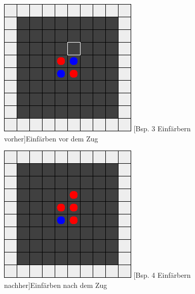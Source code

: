 \documentclass[12pt,a4paper,bibliography=totocnumbered,listof=totocnumbered]{article}
\begin{document}
\begin{figure}[H]
\centering
\begin{minipage}[c]{0.4\textwidth}
	\centering
	\includegraphics[width=\textwidth]{pics/reversi_original_map_capture_1.png}
	[Bsp. 3 Einfärbern vorher]{Einfärben vor dem Zug}
	\label{fig:capture_pre}
\end{minipage}
\hspace{0.1\textwidth}
\begin{minipage}[c]{0.4\textwidth}
	\centering
	\includegraphics[width=\textwidth]{pics/reversi_original_map_capture_2.png}
	[Bsp. 4 Einfärbern nachher]{Einfärben nach dem Zug}
	\label{fig:capture_post}
\end{minipage}
\end{figure}
\end{document}
